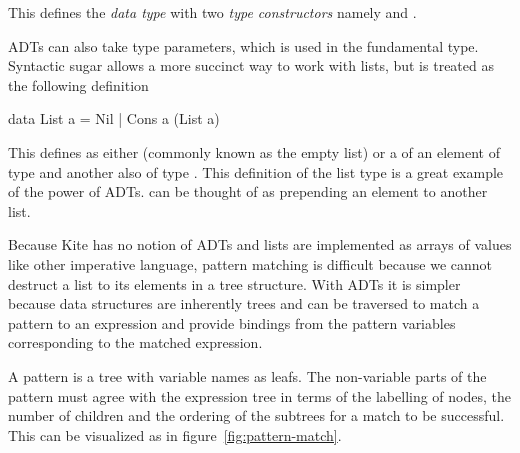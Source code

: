 This defines the \emph{data type}  with two \emph{type constructors} namely  and .

ADTs can also take type parameters, which is used in the fundamental  type. Syntactic sugar allows a more succinct way to work with lists, but is treated as the following definition

\begin{haskell}
data List a = Nil | Cons a (List a)
\end{haskell}

This defines  as either  (commonly known as the empty list) or a  of an element of type  and another  also of type . This definition of the list type is a great example of the power of ADTs.  can be thought of as prepending an element to another list.

Because Kite has no notion of ADTs and lists are implemented as arrays of values like other imperative language, pattern matching is difficult because we cannot destruct a list to its elements in a tree structure. With ADTs it is simpler because data structures are inherently trees and can be traversed to match a pattern to an expression and provide bindings from the pattern variables corresponding to the matched expression.

A pattern is a tree with variable names as leafs. The non-variable parts of the pattern must agree with the expression tree in terms of the labelling of nodes, the number of children and the ordering of the subtrees\cite[p. 514]{wilhelm95} for a match to be successful. This can be visualized as in figure~\ref{fig:pattern-match}.


